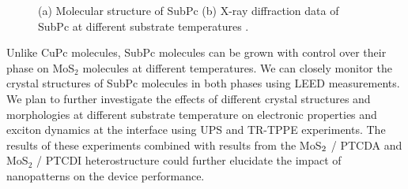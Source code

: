 \documentclass[12pt]{article}
\begin{document}
\begin{figure}[H]
\centering
{}\hspace{10pt}
\caption{(a) Molecular structure of SubPc (b) X-ray diffraction data of SubPc at different substrate temperatures \cite{chou2012effect}.}\label{fig:SubPC temp}
\end{figure}
Unlike CuPc molecules, SubPc molecules can be grown with control over their phase on MoS$_2$ molecules at different temperatures. We can closely monitor the crystal structures of SubPc molecules in both phases using LEED measurements. We plan to further investigate the  effects of different crystal structures and morphologies at different substrate temperature on electronic properties and exciton dynamics at the interface using UPS and TR-TPPE experiments. The results of these experiments combined with results from the MoS$\protect_2$ / PTCDA and MoS$_2$ / PTCDI heterostructure could further elucidate the impact of nanopatterns on the device performance.
\end{document}
